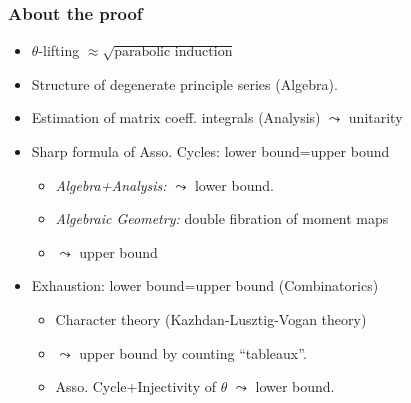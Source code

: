 \documentclass[t,11pt,usenames,dvipsnames]{beamer}
\theoremstyle{plain}
\theoremstyle{definition}
\def\blue{\color{blue}}
\let\oldemph\emph
\def\emph#1{\oldemph{\blue #1}}
\begin{document}
    \begin{frame}
      \frametitle{About the proof}
      \begin{itemize}
        \item $\theta$-lifting $\approx \sqrt{\text{parabolic induction}}$
        \item  Structure of degenerate principle series ({Algebra}). 
        \item Estimation of matrix coeff. integrals ({Analysis}) $\leadsto$ unitarity \pause
        \item  {Sharp formula of Asso. Cycles}: {\color{orange} lower bound=upper bound}
              \begin{itemize}
                \item \emph{Algebra+Analysis: } $\leadsto$ lower bound.
                \item \emph{Algebraic Geometry:} double fibration of moment maps
                \item[] \hspace{2em} $\leadsto$ upper bound
              \end{itemize}
        \item {Exhaustion}: {\color{orange} lower bound=upper bound} (Combinatorics)
              \begin{itemize}
                \item Character theory (Kazhdan-Lusztig-Vogan theory)
                \item[] $\leadsto$ upper bound by counting ``tableaux''.
                \item {Asso. Cycle+Injectivity of $\theta$} $\leadsto$
                      lower bound.
              \end{itemize}
      \end{itemize}
    \end{frame}
\end{document}

